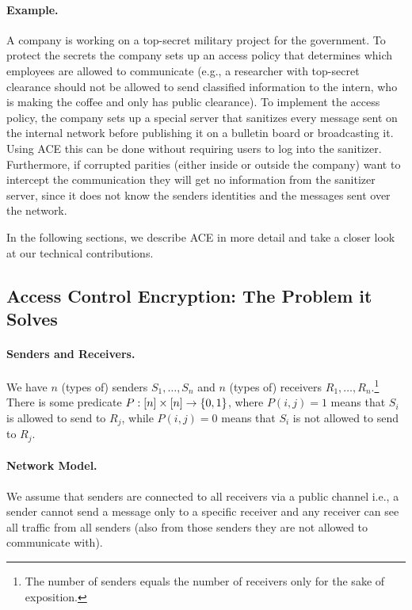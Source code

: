 \documentclass{llncs}
\begin{document}
\paragraph{Example.} A company is working on a top-secret military project for the government. To protect the secrets the company sets up an access policy that determines which employees are allowed to communicate (e.g., a researcher with top-secret clearance should not be allowed to send classified information to the intern, who is making the coffee and only has public clearance). 
To implement the access policy, the company sets up a special server that sanitizes every message sent on the internal network before publishing it on a bulletin board or broadcasting it. Using ACE this can be done without requiring users to log into the sanitizer. Furthermore,  if corrupted parities (either inside or outside the company) want to intercept the communication they will get no information from the sanitizer server, since it does not know the senders identities and the messages sent over the network.


In the following sections, we describe ACE in more detail and take a closer look at our technical contributions.


\subsection{Access Control Encryption: The Problem it Solves} 

\paragraph{Senders and Receivers.} We have $n$ (types of) senders $S_1,\ldots,S_n$ and $n$ (types of) receivers $R_1,\ldots,R_n$.\footnote{The number of senders equals the number of receivers only for the sake of exposition.} There is some predicate $P : [n] \times [n] \to \{0,1\}$, where $P(i,j)=1$ means that $S_i$ is allowed to send to $R_j$, while $P(i,j)=0$ means that $S_i$ is not allowed to send to $R_j$. 

\paragraph{Network Model.} We assume that senders are connected to all receivers via a public channel i.e., a sender cannot send a message only to a specific receiver and any receiver can see all traffic from all senders (also from those senders they are not allowed to communicate with). 
\end{document}
